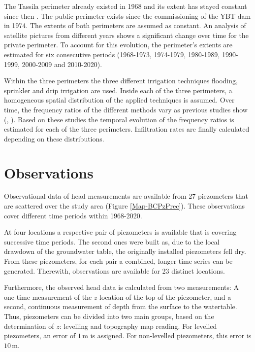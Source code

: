 The Tassila perimeter already existed in 1968 and its extent has stayed constant since then \textcite{Bernet.1977}.
The public perimeter exists since the commissioning of the YBT dam in 1974. 
The extents of both perimeters are assumed as constant. 
An analysis of satellite pictures from different years shows a significant change over time for the private perimeter. 
To account for this evolution, the perimeter's extents are estimated for six consecutive periods (1968-1973, 1974-1979, 1980-1989, 1990-1999, 2000-2009 and 2010-2020). 

Within the three perimeters the three different irrigation techniques flooding, sprinkler and drip irrigation are used. 
Inside each of the three perimeters, a homogeneous spatial distribution of the applied techniques is assumed. 
Over time, the frequency ratios of the different methods vary as previous studies show (\cite{Resing.2003}, \cite{Anzar.2016}). 
Based on these studies the temporal evolution of the frequency ratios is estimated for each of the three perimeters. 
Infiltration rates are finally calculated depending on these distributions.


\section{Observations}
\label{Sec-Piezometers}

Observational data of head measurements are available from 27 piezometers that are scattered over the study area (Figure \ref{Map-BCPzPrec}). 
These observations cover different time periods within 1968-2020.


At four locations a respective pair of piezometers is available that is covering successive time periods. 
The second ones were built as, due to the local drawdown of the groundwater table, the originally installed piezometers fell dry. 
From these piezometers, for each pair a combined, longer time series can be generated. 
Therewith, observations are available for 23 distinct locations.

Furthermore, the observed head data is calculated from two measurements: A one-time measurement of the $z$-location of the top of the piezometer, and a second, continuous measurement of depth from the surface to the watertable. 
Thus, piezometers can be divided into two main groups, based on the determination of $z$: levelling and topography map reading. 
For levelled piezometers, an error of $1 \, \textrm{m}$ is assigned. 
For non-levelled piezometers, this error is $10 \, \textrm{m}$.

